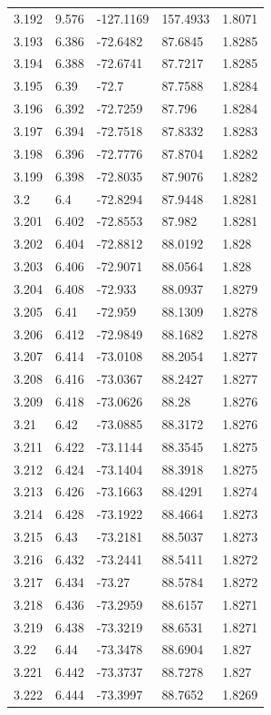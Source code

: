 \begin{tabular}{lllll}
3.192 & 9.576 & -127.1169 & 157.4933 & 1.8071 \\
3.193 & 6.386 & -72.6482 & 87.6845 & 1.8285 \\
3.194 & 6.388 & -72.6741 & 87.7217 & 1.8285 \\
3.195 & 6.39 & -72.7 & 87.7588 & 1.8284 \\
3.196 & 6.392 & -72.7259 & 87.796 & 1.8284 \\
3.197 & 6.394 & -72.7518 & 87.8332 & 1.8283 \\
3.198 & 6.396 & -72.7776 & 87.8704 & 1.8282 \\
3.199 & 6.398 & -72.8035 & 87.9076 & 1.8282 \\
3.2 & 6.4 & -72.8294 & 87.9448 & 1.8281 \\
3.201 & 6.402 & -72.8553 & 87.982 & 1.8281 \\
3.202 & 6.404 & -72.8812 & 88.0192 & 1.828 \\
3.203 & 6.406 & -72.9071 & 88.0564 & 1.828 \\
3.204 & 6.408 & -72.933 & 88.0937 & 1.8279 \\
3.205 & 6.41 & -72.959 & 88.1309 & 1.8278 \\
3.206 & 6.412 & -72.9849 & 88.1682 & 1.8278 \\
3.207 & 6.414 & -73.0108 & 88.2054 & 1.8277 \\
3.208 & 6.416 & -73.0367 & 88.2427 & 1.8277 \\
3.209 & 6.418 & -73.0626 & 88.28 & 1.8276 \\
3.21 & 6.42 & -73.0885 & 88.3172 & 1.8276 \\
3.211 & 6.422 & -73.1144 & 88.3545 & 1.8275 \\
3.212 & 6.424 & -73.1404 & 88.3918 & 1.8275 \\
3.213 & 6.426 & -73.1663 & 88.4291 & 1.8274 \\
3.214 & 6.428 & -73.1922 & 88.4664 & 1.8273 \\
3.215 & 6.43 & -73.2181 & 88.5037 & 1.8273 \\
3.216 & 6.432 & -73.2441 & 88.5411 & 1.8272 \\
3.217 & 6.434 & -73.27 & 88.5784 & 1.8272 \\
3.218 & 6.436 & -73.2959 & 88.6157 & 1.8271 \\
3.219 & 6.438 & -73.3219 & 88.6531 & 1.8271 \\
3.22 & 6.44 & -73.3478 & 88.6904 & 1.827 \\
3.221 & 6.442 & -73.3737 & 88.7278 & 1.827 \\
3.222 & 6.444 & -73.3997 & 88.7652 & 1.8269 \\

\end{tabular}
